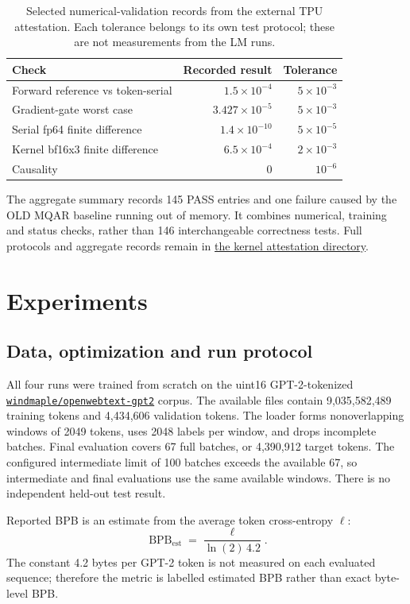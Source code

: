 \documentclass[10pt,a4paper]{article}
\newcommand{\bpb}{\operatorname{BPB}_{\mathrm{est}}}
\begin{document}
\begin{table}[htbp]\centering\small
\caption{Selected numerical-validation records from the external TPU attestation.
Each tolerance belongs to its own test protocol; these are not measurements from the LM runs.}
\label{tab:kernel-validation}
\begin{tabular}{lrr}\toprule Check&Recorded result&Tolerance\\\midrule
Forward reference vs token-serial&$1.5\times10^{-4}$&$5\times10^{-3}$\\
Gradient-gate worst case&$3.427\times10^{-5}$&$5\times10^{-3}$\\
Serial fp64 finite difference&$1.4\times10^{-10}$&$5\times10^{-5}$\\
Kernel bf16x3 finite difference&$6.5\times10^{-4}$&$2\times10^{-3}$\\
Causality&$0$&$10^{-6}$\\\bottomrule
\end{tabular}\end{table}

The aggregate summary records 145 PASS entries and one failure caused by the OLD MQAR baseline
running out of memory. It combines numerical, training and status checks, rather than
146 interchangeable correctness tests. Full protocols and aggregate records remain in
\href{https://github.com/Akseleu-J/atomic-ops/tree/main/attestation}{the kernel attestation directory}.

\section{Experiments}
\subsection{Data, optimization and run protocol}
All four runs were trained from scratch on the uint16 GPT-2-tokenized
\href{https://www.kaggle.com/datasets/windmaple/openwebtext-gpt2}{\texttt{windmaple/openwebtext-gpt2}} corpus. The available files contain 9,035,582,489
training tokens and 4,434,606 validation tokens. The loader forms nonoverlapping
windows of 2049 tokens, uses 2048 labels per window, and drops incomplete batches.
Final evaluation covers 67 full batches, or 4,390,912 target tokens. The configured
intermediate limit of 100 batches exceeds the available 67, so intermediate and final
evaluations use the same available windows. There is no independent held-out test result.

Reported BPB is an estimate from the average token cross-entropy $\ell$:
\begin{equation}
 \bpb=\frac{\ell}{\ln(2)\,4.2}.
\end{equation}
The constant 4.2 bytes per GPT-2 token is not measured on each evaluated sequence;
therefore the metric is labelled estimated BPB rather than exact byte-level BPB.
\end{document}
